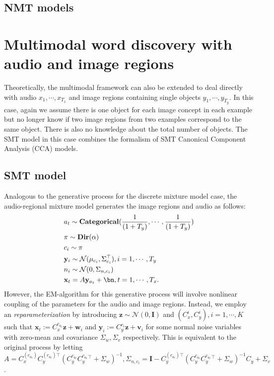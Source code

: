 \documentclass[journal]{IEEEtran}
\newcommand{\bI}{\mathbf I}
\newcommand{\bv}{\mathbf v}
\newcommand{\bw}{\mathbf w}
\newcommand{\bx}{\mathbf x}
\newcommand{\by}{\mathbf y}
\newcommand{\bz}{\mathbf z}
\begin{document}
\subsection{NMT models}

\section{Multimodal word discovery with audio and image regions}
Theoretically, the multimodal framework can also be extended to deal directly with audio $x_1, \cdots, x_{T_x}$ and image regions containing single objects $y_1, \cdots, y_{T_y}$. In this case, again we assume there is one object for each image concept in each example but no longer know if two image regions from two examples correspond to the same object. There is also no knowledge about the total number of objects. The SMT model in this case combines the formalism of SMT Canonical Component Analysis (CCA) models.
\subsection{SMT model}
Analogous to the generative process for the discrete mixture model case, the audio-regional mixture model generates the image regions and audio as follows:
\begin{align}\label{eq:audio_region_gp}
    &a_t \sim \mathbf{Categorical}(\frac{1}{(1+T_y)}, \cdots, \frac{1}{(1+T_y)})\\
    &\pi \sim \mathbf{Dir}(\alpha)\\
    &c_i \sim \pi\\
    &\by_i \sim \mathcal N(\mu_{c_i}, \Sigma_{c_i}^\top), i=1,\cdots,T_y\\
    &n_i \sim \mathcal N(0, \Sigma_{n, c_i})\\
    &\bx_t = A \by_{a_t} + \bn, t=1,\cdots,T_x.
\end{align}
However, the EM-algorithm for this generative process will involve nonlinear coupling of the parameters for the audio and image regions. Instead, we employ an \textit{reparameterization} by introducing $\bz \sim \mathcal N(0, \bI)$ and $(C_x^i, C_y^i), i=1,\cdots,K$ such that $\bx_t := C_x^{c_{a_t}} \bz + \bw_i$ and $\by_i := C_y^{c_i}\bz + \bv_i$ for some normal noise variables with zero-mean and covariance $\Sigma_w, \Sigma_v$ respectively. This is equivalent to the original process by letting $A = C_x^{(c_{a_t})}C_y^{(c_{a_t})\top} (C_y^{c_{a_t}}C_y^{c_{a_t}}^\top+\Sigma_w)^{-1}, \Sigma_{n, c_i} = \bI - C_y^{(c_{a_t})\top} (C_y^{c_{a_t}}C_y^{c_{a_t}}^\top+\Sigma_w)^{-1}C_y + \Sigma_v$. 
\end{document}
